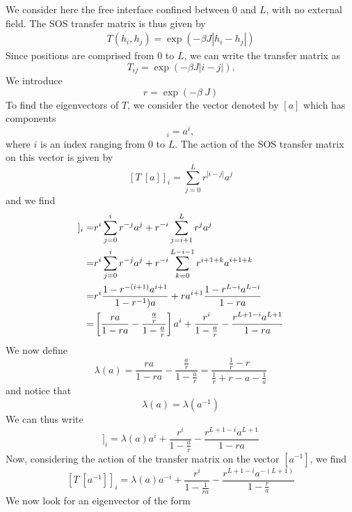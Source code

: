 We consider here the free interface confined between $0$ and $L$, with no external field. The SOS transfer matrix is thus given by 
\begin{align}
T(h_i,h_j) = \exp(-\beta J |h_i-h_j|)
\end{align}
Since positions are comprised from $0$ to $L$, we can write the transfer matrix as
\begin{equation}
T_{ij} = \exp(-\beta J|i-j|).
\end{equation}
We introduce 
\begin{equation}
r=\exp(-\beta\ J)
\end{equation}
To find the eigenvectors of $T$, we consider the vector denoted by $[a]$ which has components
\begin{equation}
[a]_i = a^i,
\end{equation}
where $i$ is an index ranging from $0$ to $L$. 
The action of the SOS transfer matrix on this vector is given by
\begin{equation}
\left[T\ [a]\right]_i = \sum_{j=0}^L r^{ |i-j|} a^j
\end{equation}
and we find
\begin{align}
[T\ [a]]_i
=& r^i \sum_{j=0}^i r^{-j} a^j + r^{-i} \sum_{j= i+1}^L r^j a^j \nn
=& r^i \sum_{j=0}^i r^{-j} a^j + r^{-i} \sum_{k= 0}^{L-i-1} r^{i+1+k} a^{i+1+k} \nn
=& r^i \frac{1- r^{-(i+1)} a^{i+1}}{1- r^{-1} )a} + r a^{i+1}\frac{1- r^{L-i} a^{L-i}}{1- r a} \nn
=&\left[\frac{ ra}{1-ra}- \frac{ \frac{a}{r}}{1-\frac{a}{r}}\right]a^i +\frac{r^i}{1-\frac{a}{r}}-\frac{r^{L+1-i}a^{L+1}}{1-ra}
\end{align}
We now define
\begin{equation}
\lambda(a)= \frac{ ra}{1-ra}- \frac{ \frac{a}{r}}{1-\frac{a}{r}} = \frac{\frac{1}{r}-r}{\frac{1}{r}+r
- a-\frac{1}{a}}
\label{elam}
\end{equation}
and notice that
\begin{equation}
\lambda(a) = \lambda(a^{-1})
\end{equation}
We can thus write
\begin{equation}
[T\ [a]]_i= \lambda(a)a^i +\frac{r^i}{1-\frac{a}{r}}-\frac{r^{L+1-i}a^{L+1}}{1-ra}
\end{equation}
Now, considering the action of the transfer matrix on the vector $[a^{-1}]$, we find
\begin{equation}
\left[T\ [a^{-1}]\right]_i = \lambda(a) a^{-i} + \frac{r^i}{1-\frac{1}{ra}}-\frac{r^{L+1-i}a^{-(L+1)}}{1-\frac{r}{a}}
\end{equation}
We now look for an eigenvector of the form
